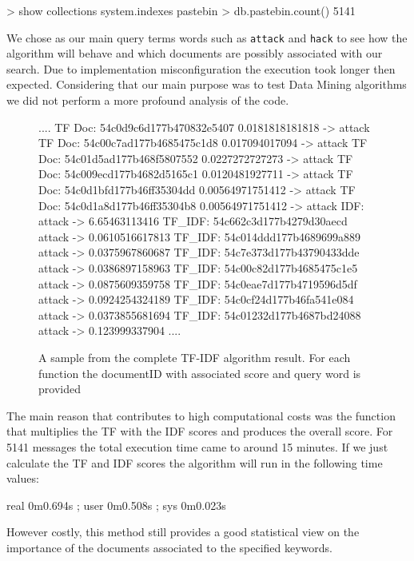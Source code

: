 \documentclass[12pt]{article}
\begin{document}
\begin{spverbatim}
> show collections
system.indexes
pastebin
> db.pastebin.count()
5141
\end{spverbatim}
\hfill \break 
We chose as our main query terms words such as \texttt{attack} and \texttt{hack} to see how the algorithm will behave and which documents are possibly associated with our search. Due to implementation misconfiguration the execution took longer then expected. Considering that our main purpose was to test Data Mining algorithms we did not perform a more profound analysis of the code.

\begin{figure}[h!] 
\begin{footnotesize} 
\begin{spverbatim}
....
TF Doc: 54c0d9c6d177b470832e5407 0.0181818181818 -> attack
TF Doc: 54c00c7ad177b4685475c1d8 0.017094017094 -> attack
TF Doc: 54c01d5ad177b468f5807552 0.0227272727273 -> attack
TF Doc: 54c009ecd177b4682d5165c1 0.0120481927711 -> attack
TF Doc: 54c0d1bfd177b46ff35304dd 0.00564971751412 -> attack
TF Doc: 54c0d1a8d177b46ff35304b8 0.00564971751412 -> attack
IDF:  attack -> 6.65463113416
TF_IDF:  54c662c3d177b4279d30aecd attack -> 0.0610516617813
TF_IDF:  54c014ddd177b4689699a889 attack -> 0.0375967860687
TF_IDF:  54c7e373d177b43790433dde attack -> 0.0386897158963
TF_IDF:  54c00c82d177b4685475c1e5 attack -> 0.0875609359758
TF_IDF:  54c0eae7d177b4719596d5df attack -> 0.0924254324189
TF_IDF:  54c0cf24d177b46fa541e084 attack -> 0.0373855681694
TF_IDF:  54c01232d177b4687bd24088 attack -> 0.123999337904
....
\end{spverbatim}
\captionsetup{font=small}
\caption{A sample from the complete TF-IDF algorithm result. For each function the documentID with associated score and query word is provided}
\end{footnotesize}
\end{figure}
The main reason that contributes to high computational costs was the function that multiplies the TF with the IDF scores and produces the overall score. For 5141 messages the total execution time came to around 15 minutes. If we just calculate the TF and IDF scores the algorithm will run in the following time values: 
\begin{spverbatim}
real	0m0.694s	;	 	user	0m0.508s	;	sys	0m0.023s
\end{spverbatim}
\hfill \break
However costly, this method still provides a good statistical view on the importance of the documents associated to the specified keywords. 
\hfill \break \\
\end{document}
